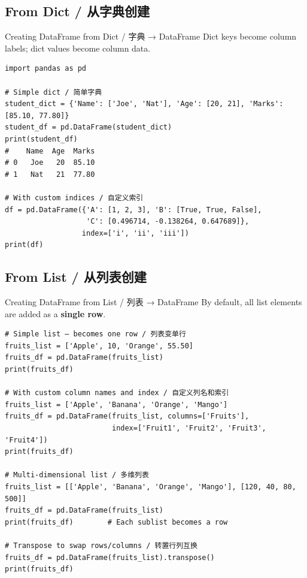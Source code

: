 \documentclass[11pt,a4paper]{article}
\begin{document}
\subsection{From Dict / 从字典创建}

\begin{examplebox}{Creating DataFrame from Dict / 字典 → DataFrame}
    Dict keys become column labels; dict values become column data.
\begin{lstlisting}
import pandas as pd

# Simple dict / 简单字典
student_dict = {'Name': ['Joe', 'Nat'], 'Age': [20, 21], 'Marks': [85.10, 77.80]}
student_df = pd.DataFrame(student_dict)
print(student_df)
#    Name  Age  Marks
# 0   Joe   20  85.10
# 1   Nat   21  77.80

# With custom indices / 自定义索引
df = pd.DataFrame({'A': [1, 2, 3], 'B': [True, True, False],
                   'C': [0.496714, -0.138264, 0.647689]},
                  index=['i', 'ii', 'iii'])
print(df)
\end{lstlisting}
\end{examplebox}

\subsection{From List / 从列表创建}

\begin{examplebox}{Creating DataFrame from List / 列表 → DataFrame}
    By default, all list elements are added as a \textbf{single row}.
\begin{lstlisting}
# Simple list — becomes one row / 列表变单行
fruits_list = ['Apple', 10, 'Orange', 55.50]
fruits_df = pd.DataFrame(fruits_list)
print(fruits_df)

# With custom column names and index / 自定义列名和索引
fruits_list = ['Apple', 'Banana', 'Orange', 'Mango']
fruits_df = pd.DataFrame(fruits_list, columns=['Fruits'],
                         index=['Fruit1', 'Fruit2', 'Fruit3', 'Fruit4'])
print(fruits_df)

# Multi-dimensional list / 多维列表
fruits_list = [['Apple', 'Banana', 'Orange', 'Mango'], [120, 40, 80, 500]]
fruits_df = pd.DataFrame(fruits_list)
print(fruits_df)        # Each sublist becomes a row

# Transpose to swap rows/columns / 转置行列互换
fruits_df = pd.DataFrame(fruits_list).transpose()
print(fruits_df)
\end{lstlisting}
\end{examplebox}
\end{document}
